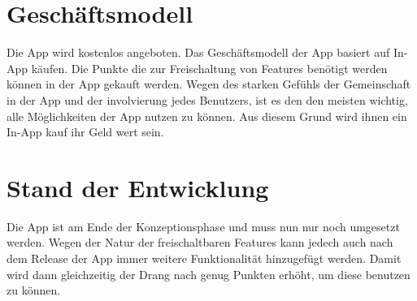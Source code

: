 \section{Geschäftsmodell}

Die App wird kostenlos angeboten. Das Geschäftsmodell der App basiert auf In-App käufen. Die Punkte die zur Freischaltung von Features benötigt werden können in der App gekauft werden. Wegen des starken Gefühls der Gemeinschaft in der App und der involvierung jedes Benutzers, ist es den den meisten wichtig, alle Möglichkeiten der App nutzen zu können. Aus diesem Grund wird ihnen ein In-App kauf ihr Geld wert sein.

\section{Stand der Entwicklung}

Die App ist am Ende der Konzeptionsphase und muss nun nur noch umgesetzt werden. Wegen der Natur der freischaltbaren Features kann jedech auch nach dem Release der App immer weitere Funktionalität hinzugefügt werden. Damit wird dann gleichzeitig der Drang nach genug Punkten erhöht, um diese benutzen zu können.